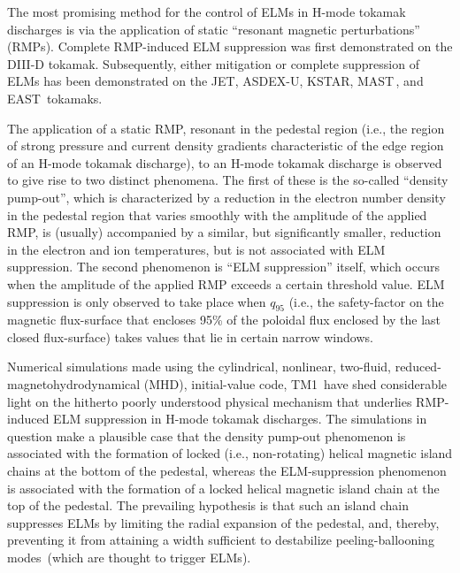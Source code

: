 \documentclass[12pt,prb,aps]{revtex4-1}
\begin{document}
The most promising method for the control of ELMs in H-mode tokamak discharges is via the application of static   ``resonant magnetic perturbations'' (RMPs). Complete RMP-induced 
ELM suppression was first demonstrated on the DIII-D tokamak.\cite{evans} Subsequently, either mitigation or complete suppression of
ELMs has been demonstrated on the JET,\cite{jet} ASDEX-U,\cite{asdex} KSTAR,\cite{kstar} MAST\,\cite{mast}, and EAST\,\cite{east} tokamaks.

The application of a static RMP, resonant in the pedestal region (i.e., the region of strong pressure and current density gradients characteristic of the edge region of an H-mode 
tokamak discharge), to an H-mode tokamak discharge is observed to give rise to  two distinct phenomena.\cite{schmitz, lanctot,paz1,d158115,paz} The first of these  is the 
so-called ``density pump-out'', which  is characterized by a reduction in the electron number density
in the pedestal region that varies smoothly with the amplitude of the applied RMP,  is (usually) accompanied by a similar, but significantly smaller, reduction
in the electron and ion temperatures, but  is not associated with ELM suppression. The second phenomenon is  ``ELM suppression'' itself, which 
 occurs when the amplitude of the applied RMP exceeds a certain threshold value. 
ELM suppression  is only observed to take place when $q_{95}$ (i.e., the safety-factor on the magnetic flux-surface that encloses 95\% of the poloidal flux enclosed by
the last closed flux-surface) takes values that lie in certain narrow windows. \cite{paz1,d158115}

Numerical simulations made using the cylindrical,  nonlinear, two-fluid, reduced-magneto\-hydro\-dynamical (MHD), initial-value code, TM1\,\cite{tm1,tm2,tm3} have shed considerable 
light on the hitherto poorly understood  physical mechanism that underlies RMP-induced ELM
suppression in H-mode tokamak discharges.\cite{hu} The simulations  in question make a plausible case  that the density  pump-out  phenomenon is associated with the formation of   
locked (i.e., non-rotating) helical magnetic
island chains at the bottom of the pedestal, whereas the ELM-suppression phenomenon is associated with the formation of a locked helical magnetic island chain at the
top of the pedestal. The prevailing hypothesis is that such an island chain suppresses ELMs by limiting the radial expansion of the
pedestal, and, thereby, preventing it from attaining a width sufficient to destabilize peeling-ballooning modes\,\cite{connor}  (which are thought to trigger ELMs).\cite{d3d}
\end{document}
